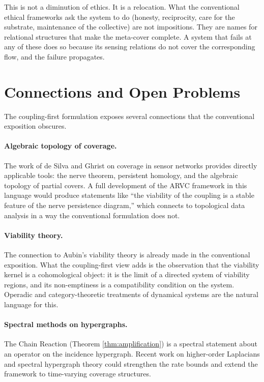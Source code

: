 \documentclass[11pt]{article}
\theoremstyle{definition}
\theoremstyle{remark}
\begin{document}
This is not a diminution of ethics. It is a relocation. What the conventional ethical frameworks ask the system to do (honesty, reciprocity, care for the substrate, maintenance of the collective) are not impositions. They are names for relational structures that make the meta-cover complete. A system that fails at any of these does so because its sensing relations do not cover the corresponding flow, and the failure propagates.

\section{Connections and Open Problems}

The coupling-first formulation exposes several connections that the conventional exposition obscures.

\paragraph{Algebraic topology of coverage.} The work of de Silva and Ghrist \cite{deSilvaGhrist, GhristBook} on coverage in sensor networks provides directly applicable tools: the nerve theorem, persistent homology, and the algebraic topology of partial covers. A full development of the ARVC framework in this language would produce statements like ``the viability of the coupling is a stable feature of the nerve persistence diagram,'' which connects to topological data analysis in a way the conventional formulation does not.

\paragraph{Viability theory.} The connection to Aubin's viability theory \cite{Aubin} is already made in the conventional exposition. What the coupling-first view adds is the observation that the viability kernel is a cohomological object: it is the limit of a directed system of viability regions, and its non-emptiness is a compatibility condition on the system. Operadic and category-theoretic treatments of dynamical systems \cite{Fong, Schultz} are the natural language for this.

\paragraph{Spectral methods on hypergraphs.} The Chain Reaction (Theorem \ref{thm:amplification}) is a spectral statement about an operator on the incidence hypergraph. Recent work on higher-order Laplacians and spectral hypergraph theory could strengthen the rate bounds and extend the framework to time-varying coverage structures.
\end{document}
